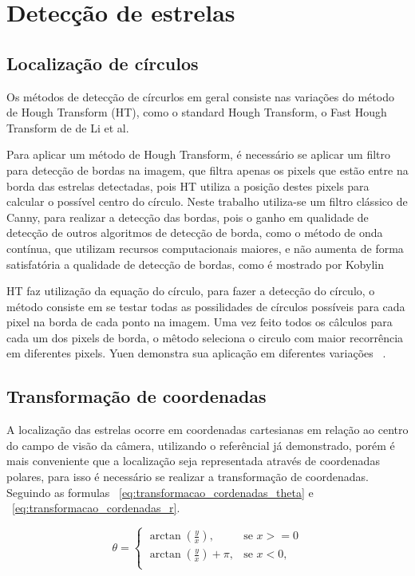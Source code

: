 \section{Detecção de estrelas}
\subsection{Localização de círculos}

Os métodos de detecção de círcurlos em geral consiste nas variações do método de Hough Transform (HT), como o standard Hough Transform, 
o Fast Hough Transform de de Li et al.

Para aplicar um método de Hough Transform, é necessário se aplicar um filtro para detecção de bordas na imagem, 
que filtra apenas os pixels que estão entre na borda das estrelas detectadas, 
pois HT utiliza a posição destes pixels para calcular o possível centro do círculo.
Neste trabalho utiliza-se um filtro clássico de Canny, para realizar a detecção das bordas, 
pois o ganho em qualidade de detecção de outros algoritmos de detecção de borda, como o método de onda contínua, 
que utilizam recursos computacionais maiores, e não aumenta de forma satisfatória a qualidade de detecção de bordas, 
como é mostrado por Kobylin ~\cite[]{kobylin2014comparison}

HT faz utilização da equação do círculo, para fazer a detecção do círculo, o método consiste em se testar todas as possilidades de círculos possíveis para cada pixel na borda de cada ponto na imagem.
Uma vez feito todos os câlculos para cada um dos pixels de borda, o mêtodo seleciona o circulo com maior recorrência em diferentes pixels. Yuen demonstra sua aplicação em diferentes variações ~\cite[]{YUEN199071}.

\subsection{Transformação de coordenadas}

A localização das estrelas ocorre em coordenadas cartesianas em relação ao centro do campo de visão da câmera, 
utilizando o referêncial já demonstrado, porém é mais conveniente que a localização seja representada através de coordenadas polares, 
para isso é necessário se realizar a transformação de coordenadas.
Seguindo as formulas  ~\ref{eq:transformacao_cordenadas_theta} e ~\ref{eq:transformacao_cordenadas_r}.

\begin{equation}
	\theta  = 
	\begin{cases}
		\arctan \left( \frac{y}{x} \right), & \text{se } x >= 0 \\
		\arctan \left( \frac{y}{x} \right) + \pi, & \text{se } x < 0, \\
	\end{cases}
	\label{eq:transformacao_cordenadas_theta}
\end{equation}

